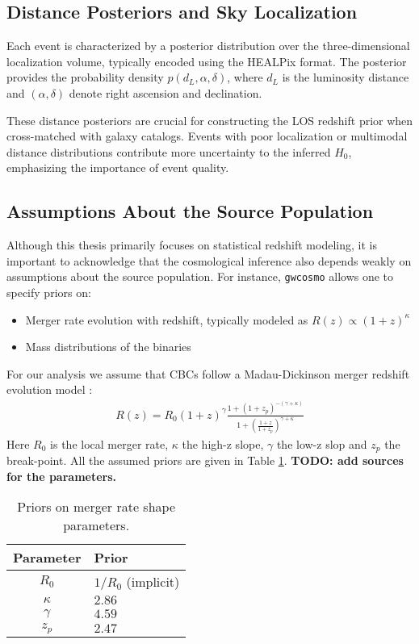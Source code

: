 \subsection{Distance Posteriors and Sky Localization}

Each event is characterized by a posterior distribution over the three-dimensional localization volume, typically encoded using the HEALPix format. The posterior provides the probability density $p(d_L, \alpha, \delta)$, where $d_L$ is the luminosity distance and $(\alpha, \delta)$ denote right ascension and declination.

These distance posteriors are crucial for constructing the \ac{LOS} redshift prior when cross-matched with galaxy catalogs. Events with poor localization or multimodal distance distributions contribute more uncertainty to the inferred $H_0$, emphasizing the importance of event quality.

\subsection{Assumptions About the Source Population}
\label{sec:source_population}

Although this thesis primarily focuses on statistical redshift modeling, it is important to acknowledge that the cosmological inference also depends weakly on assumptions about the source population. For instance, \texttt{gwcosmo} allows one to specify priors on:
\vspace{-2em}
\begin{itemize}
  \item Merger rate evolution with redshift, typically modeled as \( R(z) \propto (1+z)^\kappa \)
  \vspace{-1em}
  \item Mass distributions of the binaries
\end{itemize}

For our analysis we assume that \acp{CBC} follow a Madau-Dickinson merger redshift evolution model \citep{madau2014cosmic}:
\begin{align}
    R(z) = R_0(1+z)^{\gamma}\frac{1+(1+z_p)^{-(\gamma+\kappa)}}{1+\left( \frac{1+z}{1+z_p}\right)^{\gamma + \kappa}}
\end{align}
Here $R_0$ is the local merger rate, $\kappa$ the high-z slope, $\gamma$ the low-z slop and $z_p$ the break-point. All the assumed priors are given in Table \ref{tab:Madau}. \textbf{TODO: add sources for the parameters.}

\begin{table}[h!]
    \centering
    \caption{Priors on merger rate shape parameters.}
    \label{tab:Madau}
    \begin{tabular}{c l}
        \hline
        \textbf{Parameter} & \textbf{Prior} \\
        \hline
         $R_0$ & $1/R_0$ (implicit) \\
         $\kappa$ & $2.86$ \\
         $\gamma$ & $4.59$ \\
         $z_p$ & $2.47$ \\
         \hline
    \end{tabular}
\end{table}

